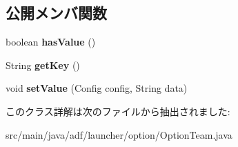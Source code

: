 \subsection*{公開メンバ関数}
\begin{DoxyCompactItemize}
\item 
\hypertarget{classadf_1_1launcher_1_1option_1_1OptionTeam_a60e2d433ec655cd2fdba6ed021b8ee16}{}\label{classadf_1_1launcher_1_1option_1_1OptionTeam_a60e2d433ec655cd2fdba6ed021b8ee16} 
boolean {\bfseries has\+Value} ()
\item 
\hypertarget{classadf_1_1launcher_1_1option_1_1OptionTeam_a1d4a084b0338528376ca2aa7eb340402}{}\label{classadf_1_1launcher_1_1option_1_1OptionTeam_a1d4a084b0338528376ca2aa7eb340402} 
String {\bfseries get\+Key} ()
\item 
\hypertarget{classadf_1_1launcher_1_1option_1_1OptionTeam_ab03902d3df21ad51767c0d6331c5dbef}{}\label{classadf_1_1launcher_1_1option_1_1OptionTeam_ab03902d3df21ad51767c0d6331c5dbef} 
void {\bfseries set\+Value} (Config config, String data)
\end{DoxyCompactItemize}


このクラス詳解は次のファイルから抽出されました\+:\begin{DoxyCompactItemize}
\item 
src/main/java/adf/launcher/option/Option\+Team.\+java\end{DoxyCompactItemize}
